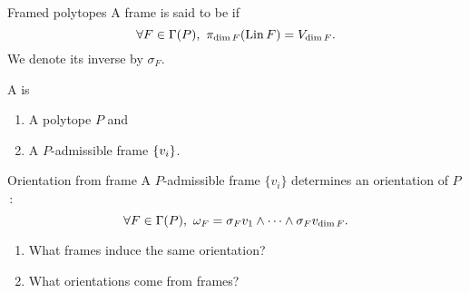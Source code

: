 \begin{frame}[fragile]{Framed polytopes}
	\pause
	A frame is said to be  if
	\[
	\forall F \in \Gamma(P),\ \pi_{\dim F}(\operatorname{Lin} F) = V_{\dim F}.
	\]
	We denote its inverse by $\sigma_F$.

	\medskip
	\begin{center}
		\qquad\qquad
	\end{center}

	\pause\medskip
	A  is
	\begin{enumerate}
		\item A polytope $P$ and
		\item A $P$-admissible frame $\{v_i\}$.
	\end{enumerate}
\end{frame}

\begin{frame}{Orientation from frame}
	\pause
	 A $P$-admissible frame $\{v_i\}$ determines an orientation of $P$\,:
	\[
	\forall F \in \Gamma(P), \ \omega_F = \sigma_F v_1 \wedge\dots\wedge \sigma_F v_{\dim F}.
	\]

	\pause{}
	\begin{enumerate}
		\item What frames induce the same orientation?
		\item What orientations come from frames?
	\end{enumerate}
\end{frame}

